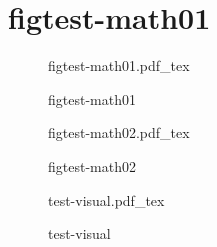 \documentclass{article}
\newcommand{\incfig}[2][1]{%
	\def\svgwidth{#1\columnwidth}
	{#2.pdf_tex}
}
\begin{document}
\section{ figtest-math01}

\begin{figure}[ht]
	\centering
	\incfig{figtest-math01}
	\caption{figtest-math01}
	\label{fig:figtest-math01}
\end{figure}

\begin{figure}[ht]
	\centering
	\incfig{figtest-math02}
	\caption{figtest-math02}
	\label{fig:figtest-math02}
\end{figure}

\begin{figure}[ht]
	\centering
	\incfig{test-visual}
	\caption{test-visual}
	\label{fig:test-visual}
\end{figure}
\end{document}
